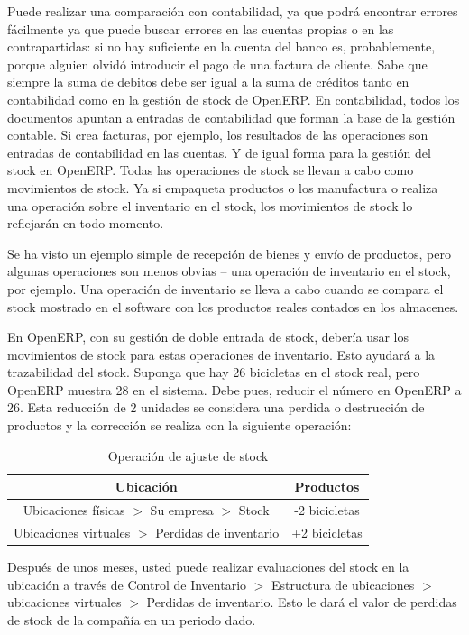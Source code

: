Puede realizar una comparación con contabilidad, ya que podrá encontrar errores fácilmente ya que puede buscar errores en las cuentas propias o en las contrapartidas: si no hay suficiente en la cuenta del banco es, probablemente, porque alguien olvidó introducir el pago de una factura de cliente. Sabe que siempre la suma de debitos debe ser igual a la suma de créditos tanto en contabilidad como en la gestión de stock de OpenERP.
En contabilidad, todos los documentos apuntan a entradas de contabilidad que forman la base de la gestión contable. Si crea facturas, por ejemplo, los resultados de las operaciones son entradas de contabilidad en las cuentas. Y de igual forma para la gestión del stock en OpenERP. Todas las operaciones de stock se llevan a cabo como movimientos de stock. Ya si empaqueta productos o los manufactura o realiza una operación sobre el inventario en el stock, los movimientos de stock lo reflejarán en todo momento.


Se ha visto un ejemplo simple de recepción de bienes y envío de productos, pero algunas operaciones son menos obvias – una operación de inventario en el stock, por ejemplo. Una operación de inventario se lleva a cabo cuando se compara el stock mostrado en el software con los productos reales contados en los almacenes.

En OpenERP, con su gestión de doble entrada de stock, debería usar los movimientos de stock para estas operaciones de inventario. Esto ayudará a la trazabilidad del stock. Suponga que hay 26 bicicletas en el stock real, pero OpenERP muestra 28 en el sistema. Debe pues, reducir el número en OpenERP a 26. Esta reducción de 2 unidades se considera una perdida o destrucción de productos y la corrección se realiza con la siguiente operación:

\begin{table}[!th]
\begin{center}
\begin{tabular}{|c|c|}
  \hline
  Ubicación & Productos \\
  \hline
  Ubicaciones físicas $>$ Su empresa $>$ Stock & -2 bicicletas \\
  \hline
  Ubicaciones virtuales $>$ Perdidas de inventario & +2 bicicletas \\
  \hline
\end{tabular}
\end{center}
\caption{Operación de ajuste de stock}
\label{al:perdidas}
\end{table}

Después de unos meses, usted puede realizar evaluaciones del stock en la ubicación a través de Control de Inventario $>$ Estructura de ubicaciones $>$ ubicaciones virtuales $>$ Perdidas de inventario. Esto le dará el valor de perdidas de stock de la compañía en un periodo dado.

